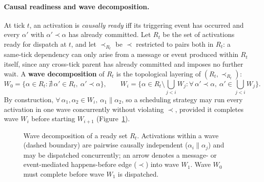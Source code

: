 \paragraph{Causal readiness and wave decomposition.}
At tick $t$, an activation is \emph{causally ready} iff its triggering event has occurred and every $\alpha'$ with $\alpha' \prec \alpha$ has already committed. Let $R_t$ be the set of activations ready for dispatch at $t$, and let $\prec_{R_t}$ be $\prec$ restricted to pairs both in $R_t$: a same-tick dependency can only arise from a message or event produced within $R_t$ itself, since any cross-tick parent has already committed and imposes no further wait. A \textbf{wave decomposition} of $R_t$ is the topological layering of $(R_t, \prec_{R_t})$:
\[
W_0 = \{\alpha \in R_t : \nexists\, \alpha' \in R_t,\ \alpha' \prec \alpha\}, \qquad
W_i = \Big\{\alpha \in R_t \setminus \textstyle\bigcup_{j<i} W_j : \forall\, \alpha' \prec \alpha,\ \alpha' \in \textstyle\bigcup_{j<i} W_j\Big\}.
\]
By construction, $\forall\, \alpha_1, \alpha_2 \in W_i,\ \alpha_1 \parallel \alpha_2$, so a scheduling strategy may run every activation in one wave concurrently without violating $\prec$, provided it completes wave $W_i$ before starting $W_{i+1}$ (Figure~\ref{fig:wave-decomposition}).

\begin{figure}[t]
\centering
{}
\caption{Wave decomposition of a ready set $R_t$. Activations within a wave (dashed boundary) are pairwise causally independent ($\alpha_i \parallel \alpha_j$) and may be dispatched concurrently; an arrow denotes a message- or event-mediated happens-before edge ($\prec$) into wave $W_1$. Wave $W_0$ must complete before wave $W_1$ is dispatched.}
\label{fig:wave-decomposition}
\end{figure}

